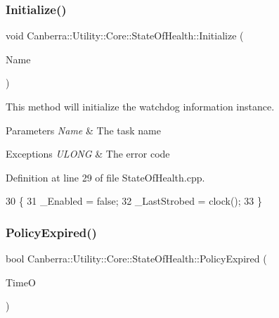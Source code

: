 \subsubsection{\texorpdfstring{Initialize()}{Initialize()}}
{\footnotesize\ttfamily void Canberra\+::\+Utility\+::\+Core\+::\+State\+Of\+Health\+::\+Initialize (\begin{DoxyParamCaption}\item[{const \hyperlink{class_canberra_1_1_utility_1_1_core_1_1_string}{String} \&}]{Name }\end{DoxyParamCaption})\hspace{0.3cm}{\ttfamily [protected]}}



This method will initialize the watchdog information instance. 


\begin{DoxyParams}{Parameters}
{\em Name} & The task name\\
\hline
\end{DoxyParams}

\begin{DoxyExceptions}{Exceptions}
{\em U\+L\+O\+NG} & The error code\\
\hline
\end{DoxyExceptions}


Definition at line 29 of file State\+Of\+Health.\+cpp.


\begin{DoxyCode}
30 \{
31     \_Enabled = \textcolor{keyword}{false};
32     \_LastStrobed = clock();
33 \}
\end{DoxyCode}
\mbox{\label{class_canberra_1_1_utility_1_1_core_1_1_state_of_health_acf1516a0f54b8ac3e5d05230ba9b3925_acf1516a0f54b8ac3e5d05230ba9b3925}} 
\subsubsection{\texorpdfstring{Policy\+Expired()}{PolicyExpired()}}
{\footnotesize\ttfamily bool Canberra\+::\+Utility\+::\+Core\+::\+State\+Of\+Health\+::\+Policy\+Expired (\begin{DoxyParamCaption}\item[{L\+O\+NG}]{TimeO }\end{DoxyParamCaption})}



